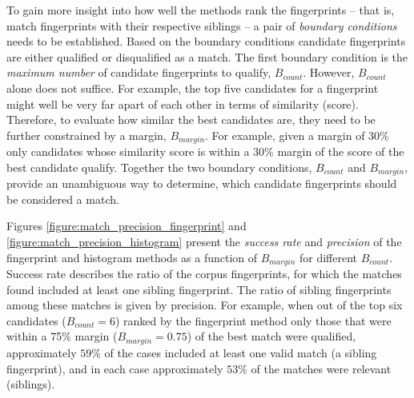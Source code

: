 \documentclass[thesis.tex]{subfiles}
\begin{document}
To gain more insight into how well the methods rank the fingerprints -- that is, match fingerprints with their respective siblings -- a pair of \emph{boundary conditions} needs to be established. Based on the boundary conditions candidate fingerprints are either qualified or disqualified as a match. The first boundary condition is the \emph{maximum number} of candidate fingerprints to qualify, $B_{count}$. However, $B_{count}$ alone does not suffice. For example, the top five candidates for a fingerprint might well be very far apart of each other in terms of similarity (score). Therefore, to evaluate how similar the best candidates are, they need to be further constrained by a margin, $B_{margin}$. For example, given a margin of 30\% only candidates whose similarity score is within a 30\% margin of the score of the best candidate qualify. Together the two boundary conditions, $B_{count}$ and $B_{margin}$, provide an unambiguous way to determine, which candidate fingerprints should be considered a match.

Figures \ref{figure:match_precision_fingerprint} and \ref{figure:match_precision_histogram} present the \emph{success rate} and \emph{precision} of the fingerprint and histogram methods as a function of $B_{margin}$ for different $B_{count}$. Success rate describes the ratio of the corpus fingerprints, for which the matches found included at least one sibling fingerprint. The ratio of sibling fingerprints among these matches is given by precision. For example, when out of the top six candidates ($B_{count}=6$) ranked by the fingerprint method only those that were within a 75\% margin ($B_{margin}=0.75$) of the best match were qualified, approximately $59\%$ of the cases included at least one valid match (a sibling fingerprint), and in each case approximately $53\%$ of the matches were relevant (siblings).

\clearpage
\end{document}
